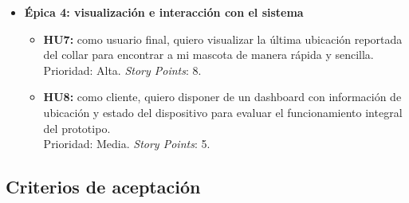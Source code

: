 \documentclass[
11pt, %
]{charter}
\begin{document}
\begin{itemize}
	\item \textbf{Épica 4: visualización e interacción con el sistema}
	\begin{itemize}
		\item \textbf{HU7:} como usuario final, quiero visualizar la última ubicación reportada del collar para encontrar a mi mascota de manera rápida y sencilla.\\
		Prioridad: Alta. \textit{Story Points}: 8.
		\item \textbf{HU8:} como cliente, quiero disponer de un dashboard con información de ubicación y estado del dispositivo para evaluar el funcionamiento integral del prototipo.\\
		Prioridad: Media. \textit{Story Points}: 5.
	\end{itemize}
\end{itemize}

\subsection*{Criterios de aceptación}
\end{document}
